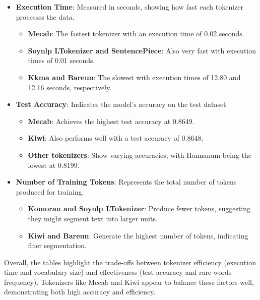 \documentclass{article}
\begin{document}
\begin{itemize}
    \item \textbf{Execution Time}: Measured in seconds, showing how fast each tokenizer processes the data.
    
    \begin{itemize}
        \item \textbf{Mecab}: The fastest tokenizer with an execution time of 0.02 seconds.
        \item \textbf{Soynlp LTokenizer and SentencePiece}: Also very fast with execution times of 0.01 seconds.
        \item \textbf{Kkma and Bareun}: The slowest with execution times of 12.80 and 12.16 seconds, respectively.
    \end{itemize}

    \item \textbf{Test Accuracy}: Indicates the model's accuracy on the test dataset.
    \begin{itemize}
        \item \textbf{Mecab}: Achieves the highest test accuracy at 0.8649.
        \item \textbf{Kiwi}: Also performs well with a test accuracy of 0.8648.
        \item \textbf{Other tokenizers}: Show varying accuracies, with Hannanum being the lowest at 0.8199.
    \end{itemize}
    \item \textbf{Number of Training Tokens}: Represents the total number of tokens produced for training.
    \begin{itemize}
        \item \textbf{Komoran and Soynlp LTokenizer}: Produce fewer tokens, suggesting they might segment text into larger units.
        \item \textbf{Kiwi and Bareun}: Generate the highest number of tokens, indicating finer segmentation.
    \end{itemize}
\end{itemize}

    Overall, the tables highlight the trade-offs between tokenizer efficiency (execution time and vocabulary size) and effectiveness (test accuracy and rare words frequency). Tokenizers like Mecab and Kiwi appear to balance these factors well, demonstrating both high accuracy and efficiency.
\end{document}
